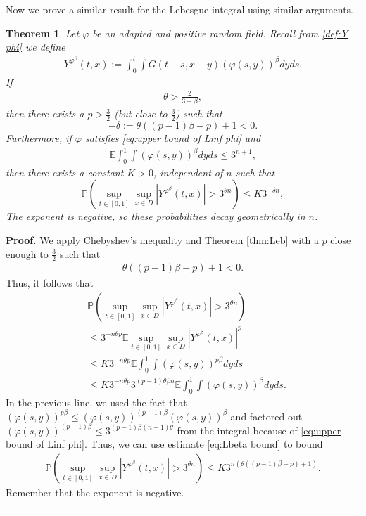 \documentclass[12pt]{article}
\newtheorem{theorem}{Theorem}
\newenvironment{proof}[1][Proof]{\noindent\textbf{#1.} }{\ \rule{0.5em}{0.5em}}
\numberwithin{equation}{section}
\begin{document}
Now we prove a similar result for the Lebesgue integral using similar arguments.
\begin{theorem}\label{thm:Lebesgue estimate case 2}
Let $\varphi$ be an adapted and positive random field. Recall from \eqref{def:Y phi} we define
\begin{align}
    Y^{\varphi^{\beta}}(t,x) := \int_0^t\int G(t-s,x-y)(\varphi(s,y))^{\beta}dyds.\label{def:Y phi case 2}
\end{align}
If
\begin{align}
    \theta>\frac{2}{3-\beta}, \label{eq:theta-lower-2}
\end{align}
then there exists a $p>\frac{3}{2}$ (but close to $\frac{3}{2}$) such that
	\[-\delta:=\theta \left((p-1)\beta-p\right) + 1<0.\]
Furthermore, if $\varphi$ satisfies \eqref{eq:upper bound of Linf phi} and
\begin{align}
    \mathbb{E}\int_0^1\int (\varphi(s,y))^{\beta}dyds\leq 3^{n+1},\label{eq:Lbeta bound}
\end{align}
then there exists a constant $K>0$, independent of $n$ such that
	\begin{equation}
		\mathbb{P}\left(\sup_{t \in [0,1]} \sup_{x \in D} |Y^{\varphi^\beta}(t,x)|>3^{\theta n}\right)
		\leq K 3^{-\delta n},\label{eq:P for Yphi}
	\end{equation}
The exponent is negative, so these probabilities decay geometrically in $n$.
\end{theorem}
\begin{proof}
	We apply Chebyshev's inequality and Theorem \ref{thm:Leb} with a $p$ close enough to $\frac{3}{2}$ such that
    \begin{align}
        \theta \left((p-1)\beta-p\right) + 1<0.
    \end{align}
    Thus, it follows that
	\begin{align}
		&\mathbb{P}\left(\sup_{t \in [0,1]} \sup_{x \in D} |Y^{\varphi^\beta}(t,x)|>3^{\theta n}\right) \nonumber\\
		&\leq 3^{-n\theta p} \mathbb{E} \sup_{t \in [0,1]} \sup_{x \in D} |Y^{\varphi^\beta}(t,x)|^p \nonumber\\
		&\leq K 3^{-n \theta p} \mathbb{E} \int_0^{1} \int (\varphi(s,y))^{p \beta}dyds\nonumber\\
        &\leq K 3^{-n \theta p}3^{(p-1)\theta\beta n}\mathbb{E} \int_0^{1} \int (\varphi(s,y))^{\beta}dyds.
	\end{align}
    In the previous line, we used the fact that $(\varphi(s,y))^{p \beta}\leq (\varphi(s,y))^{(p-1) \beta}(\varphi(s,y))^{\beta}$ and factored out $(\varphi(s,y))^{(p-1) \beta}\leq 3^{(p-1)\beta(n+1)\theta}$ from the integral because of \eqref{eq:upper bound of Linf phi}. Thus, we can use estimate \eqref{eq:Lbeta bound} to bound
    \begin{align}
        \mathbb{P}\left(\sup_{t \in [0,1]} \sup_{x \in D} |Y^{\varphi^\beta}(t,x)|>3^{\theta n}\right)
		\leq K 3^{n(\theta((p-1)\beta-p)+1)}.
    \end{align}
    Remember that the exponent is negative.
\end{proof}
\end{document}
